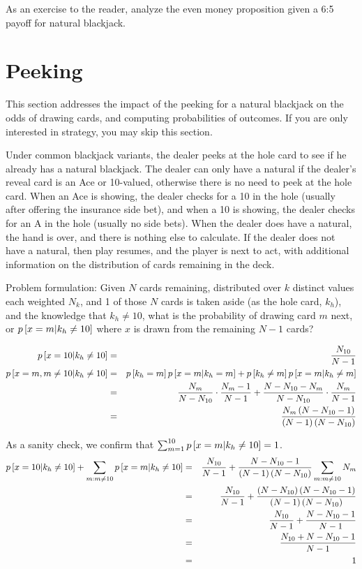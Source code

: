 As an exercise to the reader, analyze the even money proposition
given a 6:5 payoff for natural blackjack.

\section{Peeking}
\label{sec:basic:peeking}

This section addresses the impact of the peeking for a natural blackjack
on the odds of drawing cards, and computing probabilities of outcomes.
If you are only interested in strategy, you may skip this section.  

Under common blackjack variants, the dealer peeks at the hole card
to see if he already has a natural blackjack.
The dealer can only have a natural if the dealer's reveal card is an 
Ace or 10-valued, otherwise there is no need to peek at the hole card.
When an Ace is showing, the dealer checks for a 10 in the hole (usually 
after offering the insurance side bet), and when a 10 is showing, 
the dealer checks for an A in the hole (usually no side bets).
When the dealer does have a natural, the hand is over, 
and there is nothing else to calculate.
If the dealer does not have a natural, then play resumes, 
and the player is next to act, with additional information on the
distribution of cards remaining in the deck.

\noindent
Problem formulation:
Given $N$ cards remaining, distributed over $k$ distinct values 
each weighted $N_k$, and 1 of those $N$ cards is taken aside 
(as the hole card, $k_h$), and the knowledge that $k_h\neq{}10$, 
what is the probability of drawing card $m$ next, 
or $p\left[x=m|k_h\neq{}10\right]$ where $x$ is drawn from the 
remaining $N-1$ cards?

\begin{eqnarray}
p\left[x=10|k_h\neq{}10\right] &=& \frac{N_{10}}{N-1}\\
p\left[x=m,m\neq{}10|k_h\neq{}10\right] &=&
  p\left[k_h=m\right] p\left[x=m|k_h=m\right]
  +p\left[k_h\neq{}m\right] p\left[x=m|k_h\neq{}m\right]\\
&=& \frac{N_m}{N-N_{10}}\cdot\frac{N_m-1}{N-1}
  +\frac{N-N_{10}-N_m}{N-N_{10}}\cdot\frac{N_m}{N-1}\\
&=& \frac{N_m\left(N-N_{10}-1\right)}{\left(N-1\right)\left(N-N_{10}\right)}
\end{eqnarray}

As a sanity check, we confirm that $\sum_{m=1}^{10}{p\left[x=m|k_h\neq{}10\right]}=1$.
\begin{eqnarray}
p\left[x=10|k_h\neq{}10\right] +\sum_{m:m\neq{}10}^{}{p\left[x=m|k_h\neq{}10\right]} &=&
  \frac{N_{10}}{N-1}
  +\frac{N-N_{10}-1}{\left(N-1\right)\left(N-N_{10}\right)} \sum_{m:m\neq{}10}^{}{N_m}\\
&=& \frac{N_{10}}{N-1} +\frac{\left(N-N_{10}\right)\left(N-N_{10}-1\right)}{\left(N-1\right)\left(N-N_{10}\right)}\\
&=& \frac{N_{10}}{N-1} +\frac{N-N_{10}-1}{N-1}\\
&=& \frac{N_{10}+N-N_{10}-1}{N-1}\\
&=& 1
\end{eqnarray}

